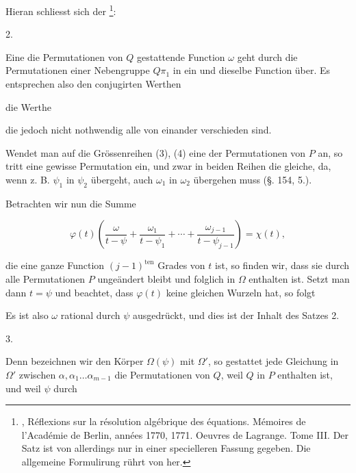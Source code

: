 
Hieran schliesst sich der \footnote{, Réflexions sur la résolution algébrique des équations. Mémoires de l'Académie de Berlin, années 1770, 1771. Oeuvres de Lagrange. Tome III. Der Satz ist von  allerdings nur in einer specielleren Fassung gegeben. Die allgemeine Formulirung rührt von  her.}:

2. 

Eine die Permutationen von $Q$ gestattende Function $\omega$ geht
durch die Permutationen einer Nebengruppe $Q\pi_1$ in ein und
dieselbe Function über. Es entsprechen also den conjugirten
Werthen


die Werthe


die jedoch nicht nothwendig alle von einander verschieden sind.

Wendet man auf die Grössenreihen (3), (4) eine der Permutationen
 von $P$ an, so tritt eine gewisse Permutation ein, und
zwar in beiden Reihen die gleiche, da, wenn z. B. $\psi_1$ in $\psi_2$ übergeht,
auch $\omega_1$ in $\omega_2$ übergehen muss (§. 154, 5.).

Betrachten wir nun die Summe

\[
\varphi(t) \left( \frac{\omega}{t - \psi} + \frac{\omega_1}{t - \psi_1} + \cdots + \frac{\omega_{j-1}}{t - \psi_{j-1}} \right) = \chi(t),
\]

die eine ganze Function $(j-1)^{\text{ten}}$ Grades von $t$ ist, so finden
wir, dass sie durch alle Permutationen $P$ ungeändert bleibt und
folglich in $\Omega$ enthalten ist. Setzt man dann $t = \psi$ und beachtet,
dass $\varphi(t)$ keine gleichen Wurzeln hat, so folgt


Es ist also $\omega$ rational durch $\psi$ ausgedrückt, und dies ist der
Inhalt des Satzes 2.

3. 

Denn bezeichnen wir den Körper $\Omega(\psi)$ mit $\Omega'$, so gestattet
 jede Gleichung in $\Omega'$ zwischen $\alpha, \alpha_1 \ldots \alpha_{m-1}$ die Permutationen
von $Q$, weil $Q$ in $P$ enthalten ist, und weil $\psi$ durch
